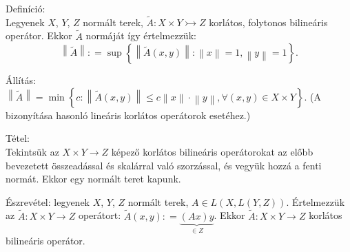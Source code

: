 \documentclass[12pt,a4paper]{scrartcl}
\newenvironment{definicio}{}{}
\newenvironment{tetel}{}{}
\newenvironment{allitas}{}{}
\begin{document}
\begin{definicio}

Definíció:\\
Legyenek \(X\), \(Y\), \(Z\) normált terek,
\(\left. \widetilde{A}:X \times Y\rightarrowtail Z \right.\) korlátos,
folytonos bilineáris operátor. Ekkor \(\widetilde{A}\) normáját így
értelmezzük:
\[\left\| \widetilde{A} \right\|: = \sup{\left\{ {\left\| {\widetilde{A}\left( {x,y} \right)} \right\|:\left\| x \right\| = 1,\left\| y \right\| = 1} \right\}.}\]

\end{definicio}

\begin{allitas}

Állítás:\\
\(\left\| \widetilde{A} \right\| = \min\left\{ {c:\left\| {\widetilde{A}\left( {x,y} \right)} \right\| \leq c\left\| x \right\| \cdot \left\| y \right\|,\forall\left( {x,y} \right) \in X \times Y} \right\}\).
(A bizonyítása hasonló lineáris korlátos operátorok esetéhez.)

\end{allitas}

\begin{tetel}

Tétel:\\
Tekintsük az \(\left. X \times Y\rightarrow Z \right.\) képező korlátos
bilineáris operátorokat az előbb bevezetett összeadással és skalárral
való szorzással, és vegyük hozzá a fenti normát. Ekkor egy normált teret
kapunk.

\end{tetel}

Észrevétel: legyenek \(X\), \(Y\), \(Z\) normált terek,
\(A \in L\left( {X,L\left( {Y,Z} \right)} \right)\). Értelmezzük az
\(\left. \widetilde{A}:X \times Y\rightarrow Z \right.\) operátort:
\(\tilde A\left( {x,y} \right): = \underbrace {\left( {Ax} \right)y}_{ \in Z}\).
Ekkor \(\left. \widetilde{A}:X \times Y\rightarrow Z \right.\) korlátos
bilineáris operátor.
\end{document}
